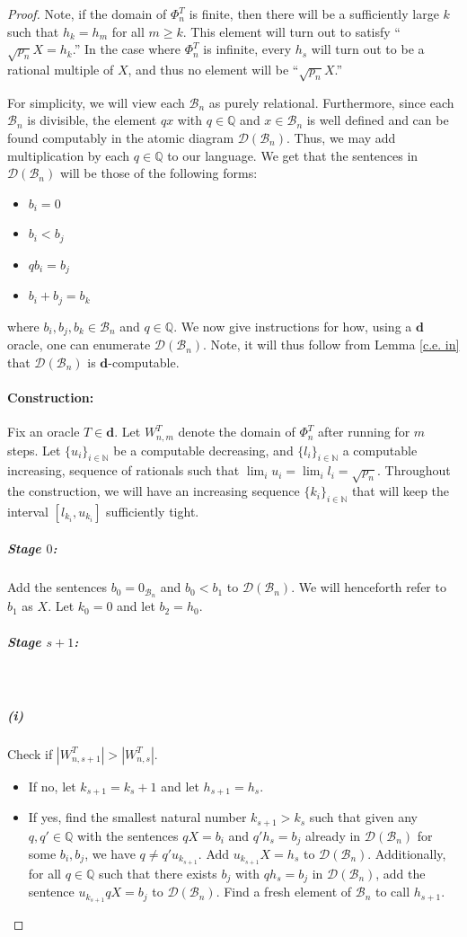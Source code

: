 \documentclass{amsart}%
\numberwithin{theorem}{section}
\newcommand{\Q}{\mathbb{Q}}
\newcommand{\N}{\mathbb{N}}
\newcommand{\B}{\mathcal{B}}
\newcommand{\D}{\mathcal{D}}
\newcommand{\0}{\emptyset}
\newcommand{\ddd}{\boldsymbol{d}}
\begin{document}
\begin{proof}
Note, if the domain of $\Phi_n^T$ is finite, then there will be a sufficiently large $k$ such that $h_{k}=h_{m}$ for all $m\geq k$. This element will turn out to satisfy ``$\sqrt{p_n}X=h_{k}$.'' In the case where $\Phi_n^T$ is infinite, every $h_s$ will turn out to be a rational multiple of $X$, and thus no element will be ``$\sqrt{p_n}X$.''

For simplicity, we will view each $\B_n $ as purely relational. Furthermore, since each $\B_n$ is divisible, the element $qx$ with $q\in \Q$ and $x\in \B_n$ is well defined and can be found computably in the atomic diagram $\D(\B_n)$.  
Thus, we may add multiplication by each $q\in \Q$ to our language. We get that the  sentences in $\D(\B_n)$ will be those of the following forms:
\begin{itemize}
    \item $b_i=0$
    \item $b_i<b_j$
    \item $qb_i=b_j$
    \item $b_i + b_j = b_k$
\end{itemize}
where $b_i,b_j,b_k\in \B_n$ and $q\in \Q$.
We now give instructions for how, using a $\ddd$ oracle, one can enumerate $\D(\B_n)$. Note, it will thus follow from Lemma \ref{c.e. in} that $\D(\B_n)$ is $\ddd$-computable.  \\

\paragraph{Construction:}  Fix an oracle $T\in \ddd$. Let $W_{n,m}^T$ denote the domain of $\Phi_n^T$ after running for $m$ steps. Let $\{u_{i}\}_{i\in \N}$ be a computable decreasing, and  $\{l_{i}\}_{i\in \N}$  a computable increasing, sequence of rationals such that  $\lim_{i}u_{i}=\lim_{i} l_{i}=\sqrt{p_n}$. Throughout the construction, we will have an increasing sequence $\{k_i\}_{i\in \N}$ that will keep the interval $[l_{k_i},u_{k_i}]$ sufficiently tight. \\

\subparagraph{Stage $0$:} Add the sentences $b_0= 0_{\B_n}$ and $b_0<b_1$ to $\D(\B_n)$. We will henceforth refer to $b_1$ as $X$. Let $k_0=0$ and let $b_2=h_{0}$.\\

\subparagraph{Stage $s+1$:}~ \\

\subparagraph{(i)} Check if $|W^T_{n,s+1}|>|W^T_{n,s}|$. 
\begin{itemize}
    \item If no, let $k_{s+1}=k_s + 1$ and let $h_{s+1}=h_s$.
    \item If yes, find the smallest natural number $k_{s+1}> k_s$ such that given any $q,q'\in \Q$ with the sentences $qX=b_i$ and $q'h_s=b_j$ already in $\D(\B_n)$ for some $b_i,b_j$, we have $q\neq q'u_{k_{s+1}}$. Add $u_{k_{s+1}} X = h_s$ to $\D(\B_n)$. Additionally, for all $q\in \Q$ such that there exists $b_j$ with $qh_s=b_j$ in $\D(\B_n)$, add the sentence $u_{k_{s+1}} q X = b_j$ to $\D(\B_n)$.  Find a fresh element of $\B_n$ to call $h_{s+1}$. \\
\end{itemize}



\end{proof}
\end{document}
